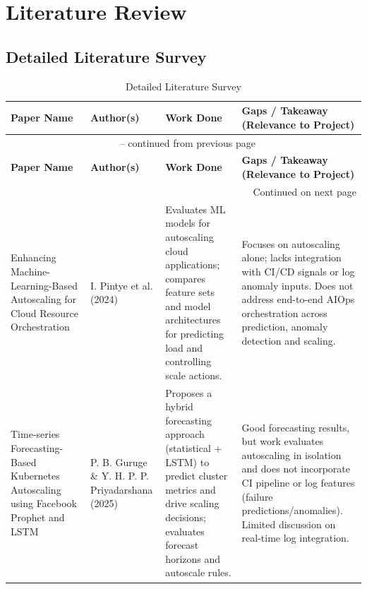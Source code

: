 \documentclass[a4paper,14pt,onecolumn]{report}
\begin{document}
\chapter{Literature Review}

\section{Detailed Literature Survey}

\begin{longtable}{|p{3.9cm}|p{2.9cm}|p{4.0cm}|p{3.4cm}|}
\caption{Detailed Literature Survey}
\label{table:lit_survey} \\
\hline
\textbf{Paper Name} & \textbf{Author(s)} & \textbf{Work Done} & \textbf{Gaps / Takeaway (Relevance to Project)} \\
\hline
\endfirsthead

\multicolumn{4}{c}{{\tablename\ \thetable{} -- continued from previous page}} \\
\hline
\textbf{Paper Name} & \textbf{Author(s)} & \textbf{Work Done} & \textbf{Gaps / Takeaway (Relevance to Project)} \\
\hline
\endhead

\hline \multicolumn{4}{r}{{Continued on next page}} \\
\endfoot

\hline
\endlastfoot


Enhancing Machine-Learning-Based Autoscaling for Cloud Resource Orchestration~\cite{pintye2024} &
I. Pintye et al. (2024) &
Evaluates ML models for autoscaling cloud applications; compares feature sets and model architectures for predicting load and controlling scale actions. &
Focuses on autoscaling alone; lacks integration with CI/CD signals or log anomaly inputs. Does not address end-to-end AIOps orchestration across prediction, anomaly detection and scaling. \\
\hline

Time-series Forecasting-Based Kubernetes Autoscaling using Facebook Prophet and LSTM~\cite{guruge2025} &
P. B. Guruge \& Y. H. P. P. Priyadarshana (2025) &
Proposes a hybrid forecasting approach (statistical + LSTM) to predict cluster metrics and drive scaling decisions; evaluates forecast horizons and autoscale rules. &
Good forecasting results, but work evaluates autoscaling in isolation and does not incorporate CI pipeline or log features (failure predictions/anomalies). Limited discussion on real-time log integration. \\
\hline


\end{longtable}
\end{document}
